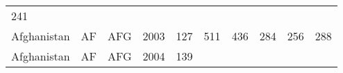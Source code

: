 \documentclass[]{article}
\begin{document}
\begin{longtable}[]{@{}lllrrrrrrr@{}}
\begin{minipage}[t]{0.09\columnwidth}
241\strut
\end{minipage}\tabularnewline
\begin{minipage}[t]{0.08\columnwidth}\raggedright\strut
Afghanistan\strut
\end{minipage} & \begin{minipage}[t]{0.04\columnwidth}\raggedright\strut
AF\strut
\end{minipage} & \begin{minipage}[t]{0.04\columnwidth}\raggedright\strut
AFG\strut
\end{minipage} & \begin{minipage}[t]{0.04\columnwidth}\raggedleft\strut
2003\strut
\end{minipage} & \begin{minipage}[t]{0.08\columnwidth}\raggedleft\strut
127\strut
\end{minipage} & \begin{minipage}[t]{0.09\columnwidth}\raggedleft\strut
511\strut
\end{minipage} & \begin{minipage}[t]{0.09\columnwidth}\raggedleft\strut
436\strut
\end{minipage} & \begin{minipage}[t]{0.09\columnwidth}\raggedleft\strut
284\strut
\end{minipage} & \begin{minipage}[t]{0.09\columnwidth}\raggedleft\strut
256\strut
\end{minipage} & \begin{minipage}[t]{0.09\columnwidth}\raggedleft\strut
288\strut
\end{minipage}\tabularnewline
\begin{minipage}[t]{0.08\columnwidth}\raggedright\strut
Afghanistan\strut
\end{minipage} & \begin{minipage}[t]{0.04\columnwidth}\raggedright\strut
AF\strut
\end{minipage} & \begin{minipage}[t]{0.04\columnwidth}\raggedright\strut
AFG\strut
\end{minipage} & \begin{minipage}[t]{0.04\columnwidth}\raggedleft\strut
2004\strut
\end{minipage} & \begin{minipage}[t]{0.08\columnwidth}\raggedleft\strut
139\strut
\end{minipage} & \begin{minipage}[t]{0.09\columnwidth}\raggedleft\strut

\end{minipage}
\end{longtable}
\end{document}
